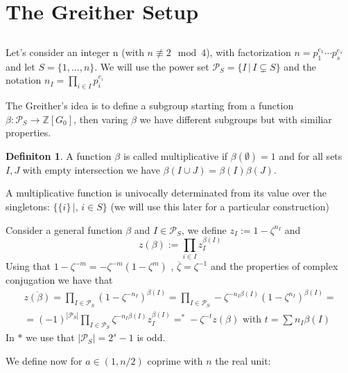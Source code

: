\documentclass[]{article}
\theoremstyle{plain}
\theoremstyle{remark}
\theoremstyle{definition}
\newtheorem{deff}[teo]{Definiton}
\newcommand{\PS}{\mathcal{P}_S}
\newcommand{\Z}{\mathbb{Z}}
\DeclareMathOperator*{\eqb }{=}
\begin{document}
\section{The Greither Setup}

	\subsection*{}
	Let's consider an integer n (with $n \not \equiv 2 \mod 4$), with factorization $ n= p_1 ^{e_1} \cdots p_s ^{e_s} $ and let $ S = \{1, ... , n \}$. We will use the power set $ \PS = \{ I \,|\, I \subsetneq S\}$ and the notation $ n_I = \prod_{i \in I} p_i ^{e_i} $ 
	
	The Greither's idea is to define a subgroup starting from a function $ \beta : \PS \to \Z[G_0] $, then varing $\beta$ we have different subgroups but with similiar properties. 
	
	\begin{deff}
		A function $\beta$ is called multiplicative if $ \beta (\emptyset) = 1 $ and for all sets $ I,J $ with empty intersection we have $ \beta (I\cup J) = \beta(I) \beta(J)$.
	\end{deff}

	A multiplicative function is univocally determinated from its value over the singletons: $ \{\{i\} \,|,\, i \in S\} $ (we will use this later for a particular construction)

	Consider a general function $\beta$ and $ I \in \PS $, we define $ z_I  := 1 - \zeta ^{n_I}$ and 
	$$ z(\beta ):= \prod_{i\in I} z_I ^{\beta(I)} $$ 
	Using that $ 1 - \zeta ^{-m} = -\zeta^{-m} ( 1 - \zeta ^m ) $ , $ \overline{ \zeta} = \zeta ^{-1}  $ and the properties of complex conjugation we have that 
	\begin{multline}\label{eq:zbetacon}
		\overline{z(\beta )} = \prod_{I \in \PS} ({1 - \zeta ^{-n_I}})^{\beta(I)}  = \prod_{I \in \PS} - \zeta ^{-n_I \beta(I)} (1 - \zeta ^{n_I})^{\beta (I)} =\\
		=(-1)^{|\PS|}\prod_{I \in \PS} \zeta ^{-n_I \beta(I)} z_I^{\beta (I)} \eqb^\ast - \zeta^{-t} z(\beta) \text{ with } t = \sum n_I \beta(I)
	\end{multline}
	In $\ast$ we use that $ |\PS| = 2^s -1 $ is odd. 
	
	We define now for $ a \in (1 , n/2)$ coprime with $ n $ the real unit:
\end{document}

